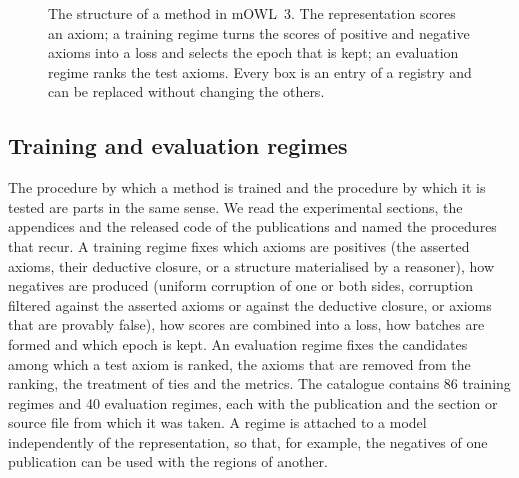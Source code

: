 \documentclass[runningheads]{llncs}
\begin{document}
\begin{figure}[t]
\centering
{}
\caption{The structure of a method in mOWL~3. The representation scores an axiom; a
training regime turns the scores of positive and negative axioms into a loss and selects
the epoch that is kept; an evaluation regime ranks the test axioms. Every box is an entry
of a registry and can be replaced without changing the others.}\label{fig:parts}
\end{figure}

\subsection{Training and evaluation regimes}

The procedure by which a method is trained and the procedure by which it is tested are
parts in the same sense. We read the experimental sections, the appendices and the
released code of the publications and named the procedures that recur. A training regime
fixes which axioms are positives (the asserted axioms, their deductive closure, or a
structure materialised by a reasoner), how negatives are produced (uniform corruption of
one or both sides, corruption filtered against the asserted axioms or against the
deductive closure, or axioms that are provably false), how scores are combined into a
loss, how batches are formed and which epoch is kept. An evaluation regime fixes the
candidates among which a test axiom is ranked, the axioms that are removed from the
ranking, the treatment of ties and the metrics. The catalogue contains 86 training
regimes and 40 evaluation regimes, each with the publication and the section or source
file from which it was taken. A regime is attached to a model independently of the
representation, so that, for example, the negatives of one publication can be used with
the regions of another.
\end{document}
